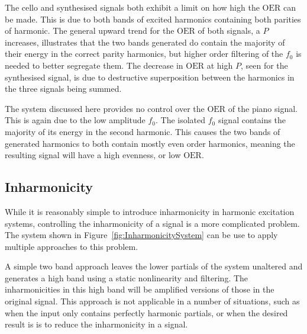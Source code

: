		The cello and synthesised signals both exhibit a limit on how high the $\mathrm{OER}$ can be made. This is
		due to both bands of excited harmonics containing both parities of harmonic.  The general upward trend for
		the $\mathrm{OER}$ of both signals, a $P$ increases, illustrates that the two bands generated do contain
		the majority of their energy in the correct parity harmonics, but higher order filtering of the $f_{0}$ is
		needed to better segregate them. The decrease in $\mathrm{OER}$ at high $P$, seen for the synthesised
		signal, is due to destructive superposition between the harmonics in the three signals being summed.

		The system discussed here provides no control over the $\mathrm{OER}$ of the piano signal. This is again
		due to the low amplitude $f_{0}$. The isolated $f_{0}$ signal contains the majority of its energy in the
		second harmonic. This causes the two bands of generated harmonics to both contain mostly even order
		harmonics, meaning the resulting signal will have a high evenness, or low $\mathrm{OER}$.

	\subsection{Inharmonicity}
	\label{sec:FeatureControl-Parameterisation-Inharmonicity}
		While it is reasonably simple to introduce inharmonicity in harmonic excitation systems, controlling the
		inharmonicity of a signal is a more complicated problem. The system shown in
		Figure~\ref{fig:InharmonicitySystem} can be use to apply multiple approaches to this problem. 

		A simple two band approach leaves the lower partials of the system unaltered and generates a high band
		using a static nonlinearity and filtering. The inharmonicities in this high band will be amplified versions
		of those in the original signal. This approach is not applicable in a number of situations, such as when
		the input only contains perfectly harmonic partials, or when the desired result is is to reduce the
		inharmonicity in a signal.
		
